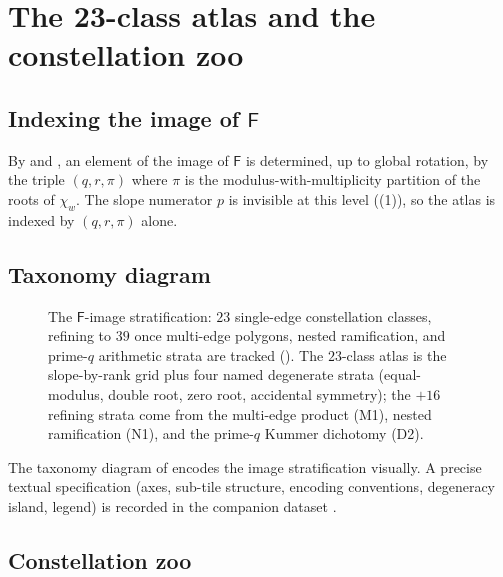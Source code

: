 \documentclass[11pt,a4paper]{article}
\theoremstyle{plain}
\theoremstyle{definition}
\theoremstyle{remark}
\newcommand{\Fclass}{\mathsf{F}}
\begin{document}
\section{The 23-class atlas and the constellation zoo}\label{sec:classes}

\subsection{\texorpdfstring{Indexing the image of $\Fclass$}{Indexing the image of F}}\label{ssec:classes-index}

By  and , an element of the image of
$\Fclass$ is determined, up to global rotation, by the triple $(q, r,
\pi)$ where $\pi$ is the modulus-with-multiplicity partition of the roots
of $\chi_w$. The slope numerator $p$ is invisible at this level
((1)), so the atlas is indexed by $(q, r, \pi)$ alone.

\subsection{Taxonomy diagram}\label{ssec:taxonomy}

\begin{figure}[t]
\centering

\caption{The $\Fclass$-image stratification: $23$ single-edge
constellation classes, refining to $39$ once multi-edge polygons,
nested ramification, and prime-$q$ arithmetic strata are tracked
(). The $23$-class atlas is the slope-by-rank
grid plus four named degenerate strata (equal-modulus, double root,
zero root, accidental symmetry); the $+16$ refining strata come from
the multi-edge product (M1), nested ramification (N1), and the
prime-$q$ Kummer dichotomy (D2).}
\label{fig:taxonomy}
\end{figure}

The taxonomy diagram of  encodes the image
stratification visually. A precise textual specification (axes, sub-tile
structure, encoding conventions, degeneracy island, legend) is recorded
in the companion dataset \cite{wkb_dataset_v1}.

\subsection{Constellation zoo}\label{ssec:zoo}
\end{document}

